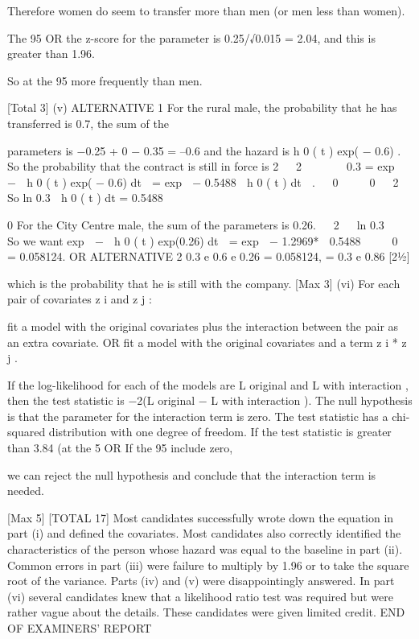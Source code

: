 \documentclass[a4paper,12pt]{article}
\begin{document}
Therefore women do seem to transfer more than men (or men less than
women).

The 95%
OR
the z-score for the parameter is 0.25/√0.015 = 2.04, and this is greater than
1.96.

So at the 95%
more frequently than men.

[Total 3]
(v)
ALTERNATIVE 1
For the rural male, the probability that he has transferred is 0.7, the sum of the

parameters is −0.25 + 0 − 0.35 = –0.6 and the hazard is h 0 ( t ) exp( − 0.6) .
So the probability that the contract is still in force is
2
  2
 
 
 
0.3 = exp  −  h 0 ( t ) exp( − 0.6) dt  = exp  − 0.5488  h 0 ( t ) dt  .
  0
 
 
0
 
2
So
ln 0.3
 h 0 ( t ) dt = 0.5488


0
For the City Centre male, the sum of the parameters is 0.26. 
  2
 
ln 0.3 

So we want exp  −  h 0 ( t ) exp(0.26) dt  = exp  − 1.2969*

0.5488 

  0
  
= 0.058124. 
OR ALTERNATIVE 2
{ 0.3 }
e 0.6
e 0.26
= 0.058124,
= 0.3 e
0.86
[21⁄2]

which is the probability that he is still with the company.
[Max 3]
(vi)
For each pair of covariates z i and z j :

fit a model with the original covariates plus the interaction between the pair as
an extra covariate.
OR
fit a model with the original covariates and a term z i * z j .

If the log-likelihood for each of the models are L original and L with interaction , 
then the test statistic is −2(L original − L with interaction ). 
The null hypothesis is that the parameter for the interaction term is zero. 
The test statistic has a chi-squared distribution with one degree of freedom. 
If the test statistic is greater than 3.84 (at the 5%
OR
If the 95%
include zero,

we can reject the null hypothesis and conclude that the interaction term is
needed.

[Max 5]
[TOTAL 17]
Most candidates successfully wrote down the equation in part (i) and defined
the covariates. Most candidates also correctly identified the characteristics of
the person whose hazard was equal to the baseline in part (ii). Common
errors in part (iii) were failure to multiply by 1.96 or to take the square root of
the variance. Parts (iv) and (v) were disappointingly answered. In part (vi)
several candidates knew that a likelihood ratio test was required but were
rather vague about the details. These candidates were given limited credit.
END OF EXAMINERS’ REPORT
\end{document}
